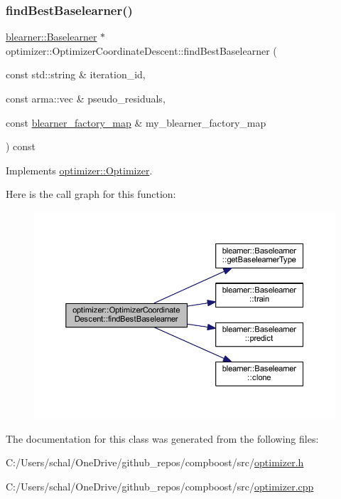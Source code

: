 \subsubsection{\texorpdfstring{find\+Best\+Baselearner()}{findBestBaselearner()}}
{\footnotesize\ttfamily \mbox{\hyperlink{classblearner_1_1_baselearner}{blearner\+::\+Baselearner}} $\ast$ optimizer\+::\+Optimizer\+Coordinate\+Descent\+::find\+Best\+Baselearner (\begin{DoxyParamCaption}\item[{const std\+::string \&}]{iteration\+\_\+id,  }\item[{const arma\+::vec \&}]{pseudo\+\_\+residuals,  }\item[{const \mbox{\hyperlink{baselearner__factory__list_8h_a058570e00ae11b882cfed36eb40be025}{blearner\+\_\+factory\+\_\+map}} \&}]{my\+\_\+blearner\+\_\+factory\+\_\+map }\end{DoxyParamCaption}) const\hspace{0.3cm}{\ttfamily [virtual]}}



Implements \mbox{\hyperlink{classoptimizer_1_1_optimizer_a134c7b34ed868231fbab53e9ebfa8fd8}{optimizer\+::\+Optimizer}}.

Here is the call graph for this function\+:\nopagebreak
\begin{figure}[H]
\begin{center}
\leavevmode
\includegraphics[width=350pt]{classoptimizer_1_1_optimizer_coordinate_descent_af657f2f5f702bddab8c640368704d18c_cgraph}
\end{center}
\end{figure}


The documentation for this class was generated from the following files\+:\begin{DoxyCompactItemize}
\item 
C\+:/\+Users/schal/\+One\+Drive/github\+\_\+repos/compboost/src/\mbox{\hyperlink{optimizer_8h}{optimizer.\+h}}\item 
C\+:/\+Users/schal/\+One\+Drive/github\+\_\+repos/compboost/src/\mbox{\hyperlink{optimizer_8cpp}{optimizer.\+cpp}}\end{DoxyCompactItemize}
